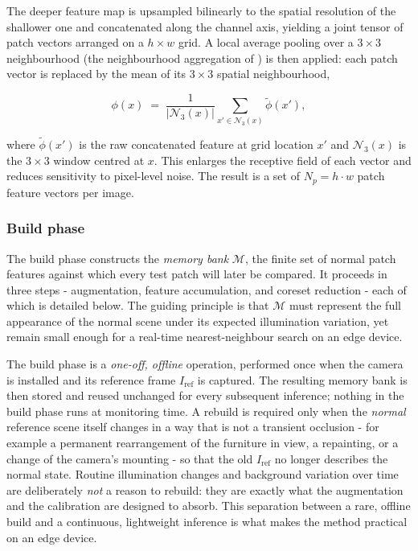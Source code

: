 The deeper feature map is upsampled bilinearly to the spatial resolution of the
shallower one and concatenated along the channel axis, yielding a joint tensor of
patch vectors arranged on a $h \times w$ grid. A local average pooling over a
$3 \times 3$ neighbourhood (the neighbourhood aggregation of
\cite{Roth2022}) is then applied: each patch vector is replaced by the mean of
its $3 \times 3$ spatial neighbourhood,

\begin{equation}
  \phi(x) \;=\; \frac{1}{|\mathcal{N}_3(x)|} \sum_{x' \in \mathcal{N}_3(x)} \tilde\phi(x'),
  \label{eq:nbagg}
\end{equation}

where $\tilde\phi(x')$ is the raw concatenated feature at grid location $x'$ and
$\mathcal{N}_3(x)$ is the $3 \times 3$ window centred at $x$. This enlarges the
receptive field of each vector and reduces sensitivity to pixel-level noise. The
result is a set of $N_p = h \cdot w$ patch feature vectors per image.

\subsubsection{Build phase}

The build phase constructs the \emph{memory bank} $\mathcal{M}$, the finite set of
normal patch features against which every test patch will later be compared. It
proceeds in three steps - augmentation, feature accumulation, and coreset
reduction - each of which is detailed below. The guiding principle is that
$\mathcal{M}$ must represent the full appearance of the normal scene under its
expected illumination variation, yet remain small enough for a real-time
nearest-neighbour search on an edge device.

The build phase is a \emph{one-off, offline} operation, performed once when the
camera is installed and its reference frame $I_{\mathrm{ref}}$ is captured. The
resulting memory bank is then stored and reused unchanged for every subsequent
inference; nothing in the build phase runs at monitoring time. A rebuild is
required only when the \emph{normal} reference scene itself changes in a way that
is not a transient occlusion - for example a permanent rearrangement of the
furniture in view, a repainting, or a change of the camera's mounting - so that
the old $I_{\mathrm{ref}}$ no longer describes the normal state. Routine
illumination changes and background variation over time are deliberately
\emph{not} a reason to rebuild: they are exactly what the augmentation and the
calibration are designed to absorb. This separation between a rare, offline build
and a continuous, lightweight inference is what makes the method practical on an
edge device.

